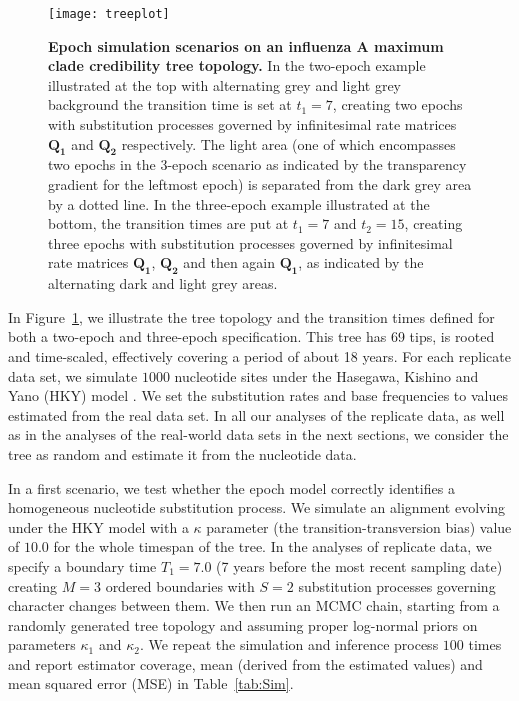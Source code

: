 \begin{figure}[h!]
\centering
\texttt{[image: treeplot]} 
\caption{
{ \footnotesize 
{\bf  Epoch simulation scenarios on an influenza A maximum clade credibility tree topology.} 
In the two-epoch example illustrated at the top with alternating grey and light grey background
the transition time is set at $t_{1}=7$, creating two epochs with substitution processes governed by infinitesimal rate matrices $\mathbf{Q_{1}}$ and $\mathbf{Q_{2}}$ respectively.
The light area (one of which encompasses  two epochs in the 3-epoch scenario as indicated by the transparency gradient for the leftmost epoch) is separated from the dark grey area by a dotted line.
In the three-epoch example illustrated 
at the bottom, %
the transition times are put at $t_{1}=7$ and $t_{2}=15$, creating three epochs with substitution processes governed by infinitesimal rate matrices $\mathbf{Q_{1}}$, $\mathbf{Q_{2}}$ and then again $\mathbf{Q_{1}}$, as indicated by the alternating dark and light grey areas.
}%
}%
\label{fig:2RateTree}
\end{figure}

In Figure~\ref{fig:2RateTree}, we illustrate the tree topology and the transition times defined for both a two-epoch and three-epoch specification.
This tree has 69 tips, is rooted and time-scaled, effectively covering a period of about 18 years. 
For each replicate data set, we simulate $1000$ nucleotide sites under the Hasegawa, Kishino and Yano (HKY) model \citep{hky85}. 
We set the substitution rates and base frequencies to values estimated from the real data set.
In all our analyses of the replicate data, as well as in the analyses of the real-world data sets in the next sections, we consider the tree as random and estimate it from the nucleotide data.

In a first scenario, we test whether the epoch model correctly identifies a homogeneous nucleotide substitution process. 
We simulate an alignment evolving under the HKY model with a $\kappa$ parameter (the transition-transversion bias) value of $10.0$ for the whole timespan of the tree. 
In the analyses of replicate data, we specify a boundary time $T_1=7.0$ (7 years before the most recent sampling date) creating $M=3$ ordered boundaries with $S=2$ substitution processes governing character changes between them.
We then run an MCMC chain, starting from a randomly generated tree topology and assuming proper log-normal priors on parameters $\kappa_{1}$ and $\kappa_{2}$.
We repeat the simulation and inference process $100$ times and report estimator coverage, mean (derived from the estimated values) and mean squared error (MSE) in Table~\ref{tab:Sim}.

